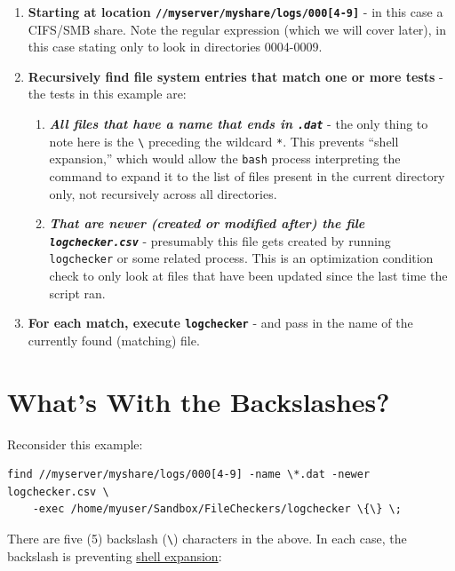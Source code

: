 \documentclass[10pt,]{book}
\numberwithin{figure}{chapter}
\begin{document}
\begin{enumerate}
\def\labelenumi{\arabic{enumi}.}
\item
  \textbf{Starting at location
  \texttt{//myserver/myshare/logs/000{[}4-9{]}}} - in this case a
  CIFS/SMB share. Note the regular expression (which we will cover
  later), in this case stating only to look in directories 0004-0009.
\item
  \textbf{Recursively find file system entries that match one or more
  tests} - the tests in this example are:

  \begin{enumerate}
  \def\labelenumii{\alph{enumii}.}
  \item
    \textbf{\emph{All files that have a name that ends in
    \texttt{.dat}}} - the only thing to note here is the
    \texttt{\textbackslash{}} preceding the wildcard \texttt{*}. This
    prevents ``shell expansion,'' which would allow the \texttt{bash}
    process interpreting the command to expand it to the list of files
    present in the current directory only, not recursively across all
    directories.
  \item
    \textbf{\emph{That are newer (created or modified after) the file
    \texttt{logchecker.csv}}} - presumably this file gets created by
    running \texttt{logchecker} or some related process. This is an
    optimization condition check to only look at files that have been
    updated since the last time the script ran.
  \end{enumerate}
\item
  \textbf{For each match, execute \texttt{logchecker}} - and pass in the
  name of the currently found (matching) file.
\end{enumerate}

\section{What's With the Backslashes?}\label{whats-with-the-backslashes}

Reconsider this example:

\begin{verbatim}
find //myserver/myshare/logs/000[4-9] -name \*.dat -newer logchecker.csv \
    -exec /home/myuser/Sandbox/FileCheckers/logchecker \{\} \;
\end{verbatim}

There are five (5) backslash (\texttt{\textbackslash{}}) characters in
the above. In each case, the backslash is preventing
\href{http://www.tldp.org/LDP/Bash-Beginners-Guide/html/sect_03_04.html}{shell
expansion}:
\end{document}
